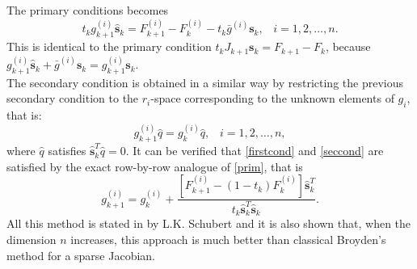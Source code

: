   The primary conditions becomes
\begin{equation}
\label{firstcond}
	t_k g_{k+1}^{(i)} \hat{\textbf{s}}_k = F_{k+1}^{(i)} -F_{k}^{(i)} - t_k \bar{g}^{(i)} \textbf{s}_k, \; \; \; i = 1,2,\dots,n.
\end{equation}
  This is identical to the primary condition $ t_k J_{k+1} \textbf{s}_k = F_{k+1} - F_k$, because $ g_{k+1}^{(i)} \hat{\textbf{s}}_k + \bar{g}^{(i)} \textbf{s}_k = g_{k+1}^{(i)} \textbf{s}_k$. \\
  The secondary condition is obtained in a similar way by restricting the previous secondary condition to the $ r_i $-space corresponding to the unknown elements of $ g_i $, that is:
  \begin{equation}
  \label{seccond}
  g_{k+1}^{(i)} \hat{q} = g_k^{(i)} \hat{q}, \; \; \; i = 1, 2, \dots, n,
  \end{equation}
  where $ \hat{q} $ satisfies $ \hat{\textbf{s}}_{k}^{T} \hat{q} = 0 $.
  It can be verified that \eqref{firstcond} and \eqref{seccond} are satisfied by the exact row-by-row analogue of \eqref{prim}, that is 
  \begin{equation*}
  g_{k+1}^{(i)} = g_{k}^{(i)} + \frac{ [ F_{k+1}^{(i)} - (1-t_k) F_k^{(i)} ] \hat{\textbf{s}}_k^T}{t_k \hat{\textbf{s}}_k^T \hat{\textbf{s}}_k}.
  \end{equation*}
  All this method is stated in \cite{Schubert} by L.K. Schubert and it is also shown that, when the dimension $ n $ increases, this approach is much better than classical Broyden's method for a sparse Jacobian.
  

